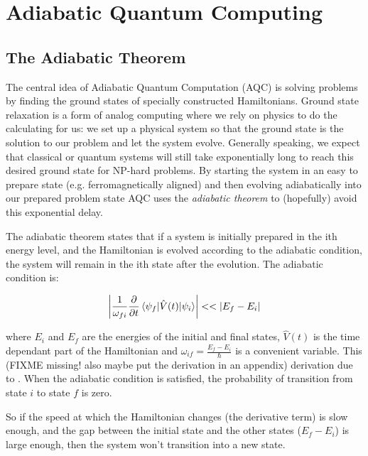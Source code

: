 \chapter{Adiabatic Quantum Computing}
\label{chap:aqc}

\section{The Adiabatic Theorem}

The central idea of Adiabatic Quantum Computation (AQC) is solving problems by finding the ground states of specially constructed Hamiltonians.\cite{farhi}  Ground state relaxation is a form of analog computing where we rely on physics to do the calculating for us: we set up a physical system so that the ground state is the solution to our problem and let the system evolve.  Generally speaking, we expect that classical or quantum systems will still take exponentially long to reach this desired ground state for NP-hard problems.\cite{aaronson}
By starting the system in an easy to prepare state (e.g. ferromagnetically aligned) and then evolving adiabatically into our prepared problem state AQC uses the \emph{adiabatic theorem} to (hopefully) avoid this exponential delay.

The adiabatic theorem states that if a system is initially prepared in the ith energy level, and the Hamiltonian is evolved according to the adiabatic condition, the system will remain in the ith state after the evolution.  The adiabatic condition is:

\begin{equation}
	\left | \frac{1}{\omega_{fi}}\frac{\partial}{\partial t} \mathinner{\langle{\psi_f | \hat{V}(t) | \psi_i}\rangle} \right | << |E_f - E_i|
\end{equation}

where $E_i$ and $E_f$ are the energies of the initial and final states, $\hat{V}(t)$ is the time dependant part of the Hamiltonian and $\omega_{if} = \frac{E_f - E_i}{\hbar}$ is a convenient variable.  This (FIXME missing! also maybe put the derivation in an appendix) derivation due to \cite{zettili}.  When the adiabatic condition is satisfied, the probability of transition from state $i$ to state $f$ is zero.

So if the speed at which the Hamiltonian changes (the derivative term) is slow enough, and the gap between the initial state and the other states ($E_f - E_i$) is large enough, then the system won't transition into a new state.  


